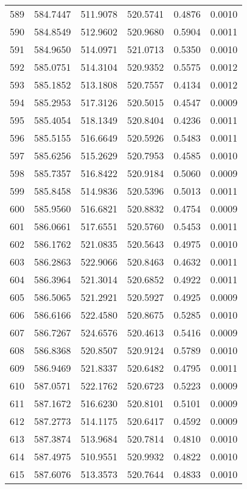 \documentclass{article}
\begin{document}
\begin{longtable}{|c|c|c|c|c|c|}
589 & 584.7447 & 511.9078 & 520.5741 & 0.4876 & 0.0010 \\
590 & 584.8549 & 512.9602 & 520.9680 & 0.5904 & 0.0011 \\
591 & 584.9650 & 514.0971 & 521.0713 & 0.5350 & 0.0010 \\
592 & 585.0751 & 514.3104 & 520.9352 & 0.5575 & 0.0012 \\
593 & 585.1852 & 513.1808 & 520.7557 & 0.4134 & 0.0012 \\
594 & 585.2953 & 517.3126 & 520.5015 & 0.4547 & 0.0009 \\
595 & 585.4054 & 518.1349 & 520.8404 & 0.4236 & 0.0011 \\
596 & 585.5155 & 516.6649 & 520.5926 & 0.5483 & 0.0011 \\
597 & 585.6256 & 515.2629 & 520.7953 & 0.4585 & 0.0010 \\
598 & 585.7357 & 516.8422 & 520.9184 & 0.5060 & 0.0009 \\
599 & 585.8458 & 514.9836 & 520.5396 & 0.5013 & 0.0011 \\
600 & 585.9560 & 516.6821 & 520.8832 & 0.4754 & 0.0009 \\
601 & 586.0661 & 517.6551 & 520.5760 & 0.5453 & 0.0011 \\
602 & 586.1762 & 521.0835 & 520.5643 & 0.4975 & 0.0010 \\
603 & 586.2863 & 522.9066 & 520.8463 & 0.4632 & 0.0011 \\
604 & 586.3964 & 521.3014 & 520.6852 & 0.4922 & 0.0011 \\
605 & 586.5065 & 521.2921 & 520.5927 & 0.4925 & 0.0009 \\
606 & 586.6166 & 522.4580 & 520.8675 & 0.5285 & 0.0010 \\
607 & 586.7267 & 524.6576 & 520.4613 & 0.5416 & 0.0009 \\
608 & 586.8368 & 520.8507 & 520.9124 & 0.5789 & 0.0010 \\
609 & 586.9469 & 521.8337 & 520.6482 & 0.4795 & 0.0011 \\
610 & 587.0571 & 522.1762 & 520.6723 & 0.5223 & 0.0009 \\
611 & 587.1672 & 516.6230 & 520.8101 & 0.5101 & 0.0009 \\
612 & 587.2773 & 514.1175 & 520.6417 & 0.4592 & 0.0009 \\
613 & 587.3874 & 513.9684 & 520.7814 & 0.4810 & 0.0010 \\
614 & 587.4975 & 510.9551 & 520.9932 & 0.4822 & 0.0010 \\
615 & 587.6076 & 513.3573 & 520.7644 & 0.4833 & 0.0010 \\

\end{longtable}
\end{document}

